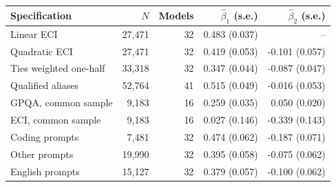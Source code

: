 \begin{tabular}{lrrrr}
\toprule
Specification & $N$ & Models & $\widehat\beta_1$ (s.e.) & $\widehat\beta_2$ (s.e.) \\
\midrule
Linear ECI & 27,471 & 32 & 0.483 (0.037) & -- \\
Quadratic ECI & 27,471 & 32 & 0.419 (0.053) & -0.101 (0.057) \\
Ties weighted one-half & 33,318 & 32 & 0.347 (0.044) & -0.087 (0.047) \\
Qualified aliases & 52,764 & 41 & 0.515 (0.049) & -0.016 (0.053) \\
GPQA, common sample & 9,183 & 16 & 0.259 (0.035) & 0.050 (0.020) \\
ECI, common sample & 9,183 & 16 & 0.027 (0.146) & -0.339 (0.143) \\
Coding prompts & 7,481 & 32 & 0.474 (0.062) & -0.187 (0.071) \\
Other prompts & 19,990 & 32 & 0.395 (0.058) & -0.075 (0.062) \\
English prompts & 15,127 & 32 & 0.379 (0.057) & -0.100 (0.062) \\
\bottomrule
\end{tabular}
